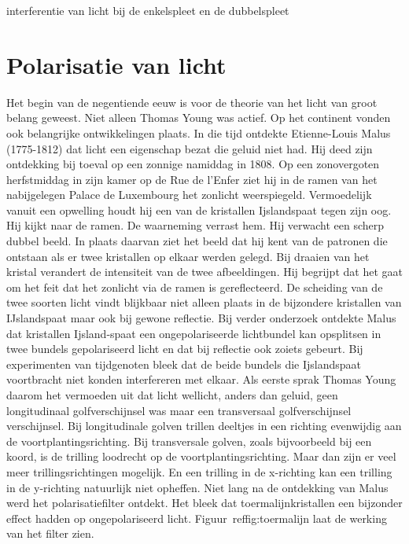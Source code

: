 \documentclass[../main.tex]{subfiles}
\begin{document}
\begin{experiment}{}
interferentie van licht bij de enkelspleet en de dubbelspleet
\end{experiment}

\section{Polarisatie van licht}
Het begin van de negentiende eeuw is voor de theorie van het licht van groot belang geweest. Niet alleen Thomas Young was actief. Op het continent vonden ook belangrijke ontwikkelingen plaats. In die tijd ontdekte Etienne-Louis Malus (1775-1812) dat licht een eigenschap bezat die geluid niet had. Hij deed zijn ontdekking bij toeval op een zonnige namiddag in 1808.
Op een zonovergoten herfstmiddag in zijn kamer op de Rue de l'Enfer ziet hij in de ramen van het nabijgelegen Palace de Luxembourg het zonlicht weerspiegeld. Vermoedelijk vanuit een opwelling houdt hij een van de kristallen Ijslandspaat tegen zijn oog. Hij kijkt naar de ramen. De waarneming verrast hem. Hij verwacht een scherp dubbel beeld. In plaats daarvan ziet het beeld dat hij kent van de patronen die ontstaan als er twee kristallen op elkaar werden gelegd. Bij draaien van het kristal verandert de intensiteit van de twee afbeeldingen. Hij begrijpt dat het gaat om het feit dat het zonlicht via de ramen is gereflecteerd. De scheiding van de twee soorten licht vindt blijkbaar niet alleen plaats in de bijzondere kristallen van IJslandspaat maar ook bij gewone reflectie. 
Bij verder onderzoek ontdekte Malus dat kristallen Ijsland-spaat een ongepolariseerde lichtbundel kan opsplitsen in twee bundels gepolariseerd licht en dat bij reflectie ook zoiets gebeurt. Bij experimenten van tijdgenoten bleek dat de beide bundels die Ijslandspaat voortbracht niet konden interfereren met elkaar. Als eerste sprak Thomas Young daarom het vermoeden uit dat licht wellicht, anders dan geluid, geen longitudinaal golfverschijnsel was maar een transversaal golfverschijnsel verschijnsel. Bij longitudinale golven trillen deeltjes in een richting evenwijdig aan de voortplantingsrichting. Bij transversale golven, zoals bijvoorbeeld bij een koord, is de trilling loodrecht op de voortplantingsrichting. Maar dan zijn er veel meer trillingsrichtingen mogelijk. En een trilling in de x-richting kan een trilling in de y-richting natuurlijk niet opheffen. 
Niet lang na de ontdekking van Malus werd het polarisatiefilter ontdekt. Het bleek dat toermalijnkristallen een bijzonder effect hadden op ongepolariseerd licht. Figuur~ref{fig:toermalijn} laat de werking van het filter zien. 
\end{document}
